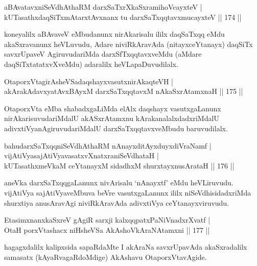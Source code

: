 \begin{shl}
aBAvatavxniSeVdhAthaRM darxSaTxrXkaSxramihoVcayxteV |\\
kUTasathxdaqSiTxmAtarxtAvxnanx tu darxSaTxqqtavxmucayxteV \hfill || 174 ||
\end{shl}

\begin{artha}
koneyalilx aBAvaveV eMbudanunx nirAkarisalu ililx daqSaTxqq eMdu akaSxravanunx heVLuvudu, Adare niviRkAravAda (nitayxceYtanayx) daqSiTx savxrUpaveV AgiruvudariMda darxSfTxqqtavxveMdu (aMdare daqSiTxtatatxvXveMdu) adaralilx heVLapaDuvudilalx.
\end{artha}

\begin{shl}
OtaporxVtagirA\s sheVSadaqshayxvasutxnirAkaqteVH |\\
akArakAdavxyatAvxBAyxM darxSaTxqqtavxM nAkaSxrAtamxnaH \hfill || 175 ||
\end{shl}

\begin{artha}
OtaporxVta eMba shabadxgaLiMda elAlx daqshayx vasutxgaLanunx nirAkarisuvudariMdalU akASxrAtamxnu kArakanalalxdadxriMdalU adivxtiVyanAgiruvudariMdalU darxSaTxqqtavxveMbudu baruvudilalx.
\end{artha}


\begin{shl}
bahudarxSaTxqqniSeVdhAthaRM nAnayxditAyxduyxdiVraNamf |\\
vijAtiVyasajAtiVyavasatxvXnatxraniSeVdhataH |\\
kUTasathxmeVkaM ceYtanayxM sidadhxM shurxtayxnusArataH \hfill || 176 ||
\end{shl}

\begin{artha}
aneVka darxSaTxqqgaLanunx nivArisalu `nAnayxtf' eMdu heVLiruvudu. vijAtiVya sajAtiVyaveMbuva beVre vasutxgaLanunx ililx niSeVdhisidadxriMda shurxtiya anusAravAgi niviRkAravAda adivxtiVya ceYtanayxviruvudu.
\end{artha}

\begin{shl}
EtasimxnanxkaSxreV gAgiR sarxji kalxqqpatxPaNiVnadxrXvatf |\\
OtaH porxVtashacx niHsheVSa AkAshoV\s kAraNAtamxni \hfill || 177 ||
\end{shl}

\begin{artha}
hagagxdalilx kalipxsida sapaRdaMte I akAraNa savxrUpavAda akaSxradalilx samasatx (kAyaRvagaRdoMdige) AkAshavu OtaporxVtavAgide.
\end{artha}

